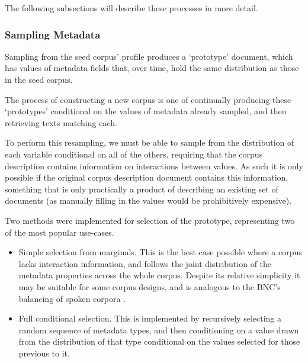 The following subsections will describe these processes in more detail.

\subsubsection{Sampling Metadata}


Sampling from the seed corpus' profile produces a `prototype' document, which has values of metadata fields that, over time, hold the same distribution as those in the seed corpus.

The process of constructing a new corpus is one of continually producing these `prototypes' conditional on the values of metadata already sampled, and then retrieving texts matching each.

To perform this resampling, we must be able to sample from the distribution of each variable conditional on all of the others, requiring that the corpus description contains information on interactions between values.  As such it is only possible if the original corpus description document contains this information, something that is only practically a product of describing an existing set of documents (as manually filling in the values would be prohibitively expensive).

Two methods were implemented for selection of the prototype, representing two of the most popular use-cases.  

\begin{itemize}
    \item Simple selection from marginals.  This is the best case possible where a corpus lacks interaction information, and follows the joint distribution of the metadata properties across the whole corpus.  Despite its relative simplicity it may be suitable for some corpus designs, and is analogous to the BNC's balancing of spoken corpora .
    \item Full conditional selection.  This is implemented by recursively selecting a random sequence of metadata types, and then conditioning on a value drawn from the distribution of that type conditional on the values selected for those previous to it.
\end{itemize}

